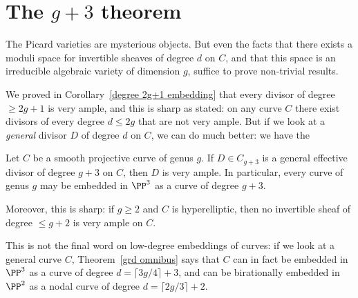 \section{The $g+3$ theorem}\label{g+3 section}


The Picard varieties are mysterious objects.  But even the facts that there exists a  moduli space for invertible sheaves of degree $d$ on $C$, and that this space is an irreducible algebraic variety of dimension $g$, suffice to prove non-trivial results. 

We proved in Corollary~\ref{degree 2g+1 embedding} that every divisor of degree $\geq 2g+1$ is very ample, and this is sharp as stated: on any curve $C$ there exist divisors of every degree $d \leq 2g$ that are not very ample. But if we look at a \emph{general} divisor $D$ of degree $d$ on  $C$, we can do much better: we have the

\begin{theorem}[$g+3$ theorem]\label{g+3 theorem}
Let $C$ be a smooth projective curve of genus $g$. If $D \in C_{g+3}$ is a general effective divisor of degree $g+3$ on $C$, then 
$D$ is very ample. In particular, every curve of genus $g$ may be embedded in $\PP^{3}$ as a curve of degree $g+3$. 

Moreover, this is sharp: if $g\geq 2$ and $C$ is hyperelliptic, then no invertible sheaf of degree $\leq g+2$ is very ample on $C$.
\end{theorem}

This is not the final word on low-degree embeddings of curves: if we look at a general curve $C$, Theorem~\ref{grd omnibus} says that $C$ can in fact be embedded in $\PP^{3}$ as a curve of degree $d = \lceil 3g/4 \rceil + 3$, and can be birationally embedded in $\PP^2$ as a nodal curve of degree $d = \lceil 2g/3 \rceil + 2$.

